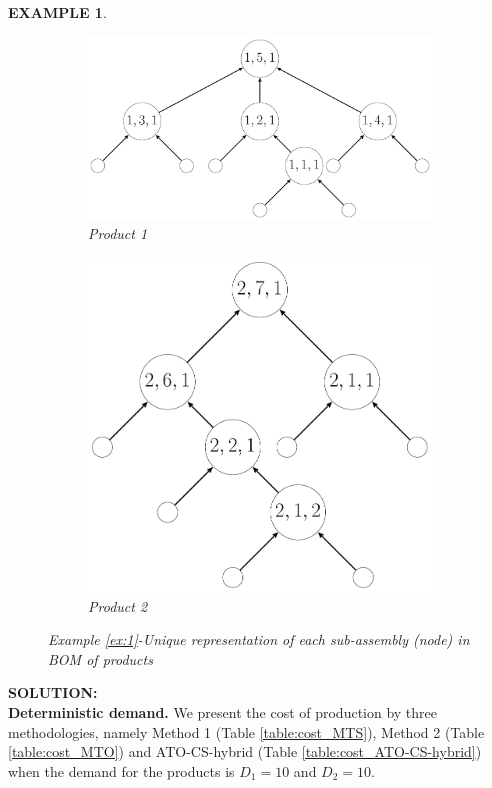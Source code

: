 \documentclass[twoside,onecolumn,12pt,letterpaper]{article}
\newtheorem{example}{EXAMPLE}
\begin{document}
\begin{example}
\begin{figure}[htbp]
\centering
\begin{subfigure}{0.6\textwidth}
\centering
\includegraphics[width=\linewidth]{figure_prod1_graph_kjm.pdf}
\caption{Product 1}
\label{fig:kjm_bom_prod1}
\end{subfigure}%
\begin{subfigure}{0.4\textwidth}
\centering
\includegraphics[width=\linewidth]{figure_prod2_graph_kjm.pdf}
\caption{Product 2}
\label{fig:kjm_bom_prod2}
\end{subfigure} 
\caption{Example \ref{ex:1}-Unique representation of each sub-assembly (node) in BOM of products}
\label{fig:kjm_bom_prods}
\end{figure}
\end{example}
\FloatBarrier
\noindent
\textbf{SOLUTION:} \\
\textbf{Deterministic demand.}
We present the cost of production by three methodologies, namely Method 1 (Table \ref{table:cost_MTS}), Method 2 (Table \ref{table:cost_MTO}) and ATO-CS-hybrid (Table \ref{table:cost_ATO-CS-hybrid}) when the demand for the products is $D_1=10$ and $D_2=10$.
\end{document}

